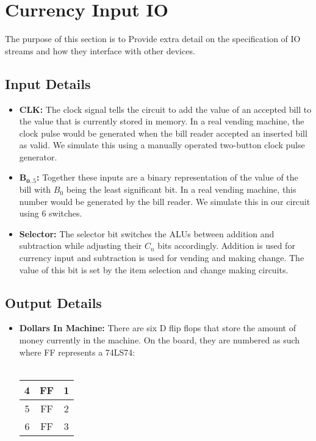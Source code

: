 \section{Currency Input IO}
The purpose of this section is to Provide extra detail on the specification of IO streams and how they interface with other devices. 

\subsection{Input Details}
\begin{itemize}
\item \textbf{CLK:} The clock signal tells the circuit to add the value of an accepted bill to the value that is currently stored in memory. In a real vending machine, the clock pulse would be generated when the bill reader accepted an inserted bill as valid. We simulate this using a manually operated two-button clock pulse generator. 
\item $\mathbf{B_{0..5}}$\textbf{:} Together these inputs are a binary representation of the value of the bill with $B_0$ being the least significant bit. In a real vending machine, this number would be generated by the bill reader. We simulate this in our circuit using 6 switches. 
\item \textbf{Selector:} The selector bit switches the ALUs between addition and subtraction while adjusting their $C_n$ bits accordingly. Addition is used for currency input and subtraction is used for vending and making change. The value of this bit is set by the item selection and change making circuits. 
\end{itemize}

\subsection{Output Details}
\begin{itemize}
\item \textbf{Dollars In Machine:} There are six D flip flops that store the amount of money currently in the machine. On the board, they are numbered as such where FF represents a 74LS74: \\\\
\begin{tabular}{|c|c|c|}
\hline 
4 & FF & 1 \\ 
\hline 
5 & FF & 2 \\ 
\hline 
6 & FF & 3 \\ 
\hline 
\end{tabular} 
\end{itemize}
